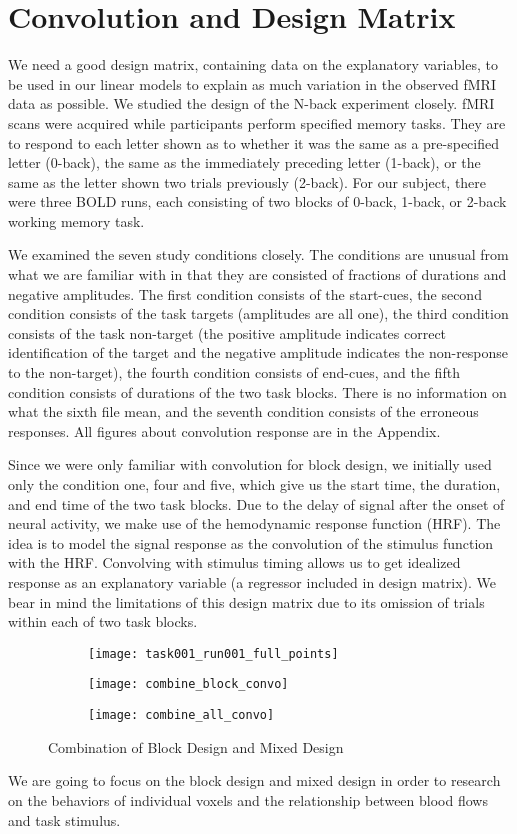 \section{Convolution and Design Matrix}

We need a good design matrix, containing data on the explanatory variables, to
be used in our linear models to explain as much variation in the observed fMRI
data as possible. We studied the design of the N-back experiment closely. fMRI 
scans were acquired while participants perform specified memory tasks. They 
are to respond to each letter shown as to whether it was the same as a 
pre-specified letter (0-back), the same as the immediately preceding letter 
(1-back), or the same as the letter shown two trials previously (2-back). 
For our subject, there were
three BOLD runs, each consisting of two blocks of 0-back, 1-back, or 2-back
working memory task. 

We examined the seven study conditions closely. The conditions are unusual from
what we are familiar with in that they are consisted of fractions of durations
and negative amplitudes. The first condition consists of
the start-cues, the second condition consists of the task targets (amplitudes
are all one), the third condition consists of the task non-target (the positive amplitude 
indicates correct identification of the target and the negative amplitude indicates the
non-response to the non-target), the fourth condition consists of end-cues, and
the fifth condition consists of durations of the two task blocks. There is no
information on what the sixth file mean, and the seventh condition consists of
the erroneous responses. All figures about convolution response are in the Appendix.

Since we were only familiar with convolution for block design, we initially used
only the condition one, four and five, which give us the start time, the
duration, and end time of the two task blocks. Due to the delay of signal after
the onset of neural activity, we make use of the hemodynamic response
function (HRF). The idea is to model the signal response as the convolution of
the stimulus function with the HRF. Convolving with stimulus timing allows us to
get idealized response as an explanatory variable (a regressor included in
design matrix). We bear in mind the limitations of this
design matrix due to its omission of trials within each of two task blocks. 

\begin{figure}[!h]
\centering
\begin{subfigure}{.33\textwidth}
  \texttt{[image: task001\_run001\_full\_points]}
\end{subfigure}%
\begin{subfigure}{.33\textwidth}
  \texttt{[image: combine\_block\_convo]}
\end{subfigure}%
\begin{subfigure}{.33\textwidth}
  \texttt{[image: combine\_all\_convo]}
  \centering
\end{subfigure}
\caption{Combination of Block Design and Mixed Design\label{fig:Comb}}
\end{figure}

We are going to focus on the block design and mixed design in order to research
on the behaviors of individual voxels and the relationship between blood flows and 
task stimulus. 
